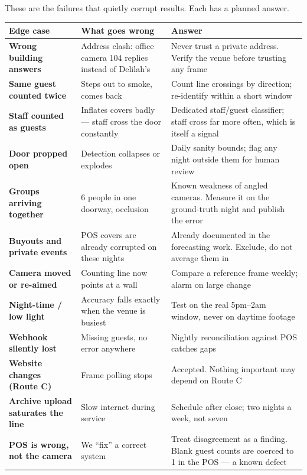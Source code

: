 \documentclass[11pt,a4paper]{article}
\begin{document}
These are the failures that quietly corrupt results. Each has a planned
answer.

\begin{center}
\small
\begin{longtable}{@{}p{4.5cm}p{5.0cm}p{5.2cm}@{}}
\toprule
\textbf{Edge case} & \textbf{What goes wrong} & \textbf{Answer} \\
\midrule
\endhead
\textbf{Wrong building answers} & Address clash: office camera 104 replies
instead of Delilah's & Never trust a private address. Verify the venue
before trusting any frame \\
\addlinespace
\textbf{Same guest counted twice} & Steps out to smoke, comes back &
Count line crossings by direction; re-identify within a short window \\
\addlinespace
\textbf{Staff counted as guests} & Inflates covers badly --- staff cross the
door constantly & Dedicated staff/guest classifier; staff cross far more
often, which is itself a signal \\
\addlinespace
\textbf{Door propped open} & Detection collapses or explodes &
Daily sanity bounds; flag any night outside them for human review \\
\addlinespace
\textbf{Groups arriving together} & 6 people in one doorway, occlusion &
Known weakness of angled cameras. Measure it on the ground-truth night
and publish the error \\
\addlinespace
\textbf{Buyouts and private events} & POS covers are already corrupted on
these nights & Already documented in the forecasting work. Exclude, do not
average them in \\
\addlinespace
\textbf{Camera moved or re-aimed} & Counting line now points at a wall &
Compare a reference frame weekly; alarm on large change \\
\addlinespace
\textbf{Night-time / low light} & Accuracy falls exactly when the venue is
busiest & Test on the real 5pm--2am window, never on daytime footage \\
\addlinespace
\textbf{Webhook silently lost} & Missing guests, no error anywhere &
Nightly reconciliation against POS catches gaps \\
\addlinespace
\textbf{Website changes (Route C)} & Frame polling stops &
Accepted. Nothing important may depend on Route C \\
\addlinespace
\textbf{Archive upload saturates the line} & Slow internet during service &
Schedule after close; two nights a week, not seven \\
\addlinespace
\textbf{POS is wrong, not the camera} & We ``fix'' a correct system &
Treat disagreement as a finding. Blank guest counts are coerced to 1 in
the POS --- a known defect \\
\bottomrule
\end{longtable}
\end{center}
\end{document}
